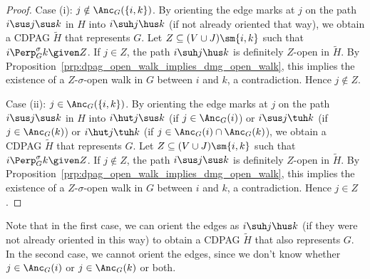 \begin{proof}
%

  Case (i): $j \notin \Anc_G(\{i,k\})$. 
  By orienting the edge marks at $j$ on the path $i \sus j \sus k$ in $H$ into $i \suh j \hus k$ (if not already oriented that way), we obtain a CDPAG $\tilde{H}$ that represents $G$.
  Let $Z \subseteq (V \cup J) \sm \{i,k\}$ such that $i \Perp^\sigma_G k \given Z$. 
  If $j \in Z$, the path $i \suh j \hus k$ is definitely $Z$-open in $\tilde{H}$.
  By Proposition~\ref{prp:dpag_open_walk_implies_dmg_open_walk}, this implies the existence of a $Z$-$\sigma$-open walk in $G$ between $i$ and $k$, a contradiction.
  Hence $j \notin Z$.

  Case (ii): $j \in \Anc_G(\{i,k\})$.
  By orienting the edge marks at $j$ on the path $i \sus j \sus k$ in $H$ into $i \hut j \sus k$ (if $j \in \Anc_G(i)$) or $i \sus j \tuh k$ (if $j \in \Anc_G(k)$) or $i \hut j \tuh k$ (if $j \in \Anc_G(i) \cap \Anc_G(k)$), we obtain a CDPAG $\tilde{H}$ that represents $G$.
  Let $Z \subseteq (V \cup J) \sm \{i,k\}$ such that $i \Perp^\sigma_G k \given Z$. 
  If $j \notin Z$, the path $i \sus j \sus k$ is definitely $Z$-open in $\tilde{H}$.
  By Proposition~\ref{prp:dpag_open_walk_implies_dmg_open_walk}, this implies the existence of a $Z$-$\sigma$-open walk in $G$ between $i$ and $k$, a contradiction.
  Hence $j \in Z$.
\end{proof}
Note that in the first case, we can orient the edges as $i \suh j \hus k$ (if they were not already oriented in this way) to obtain a CDPAG $\tilde{H}$ that also represents $G$. 
In the second case, we cannot orient the edges, since we don't know whether $j \in \Anc_G(i)$ or $j \in \Anc_G(k)$ or both.

